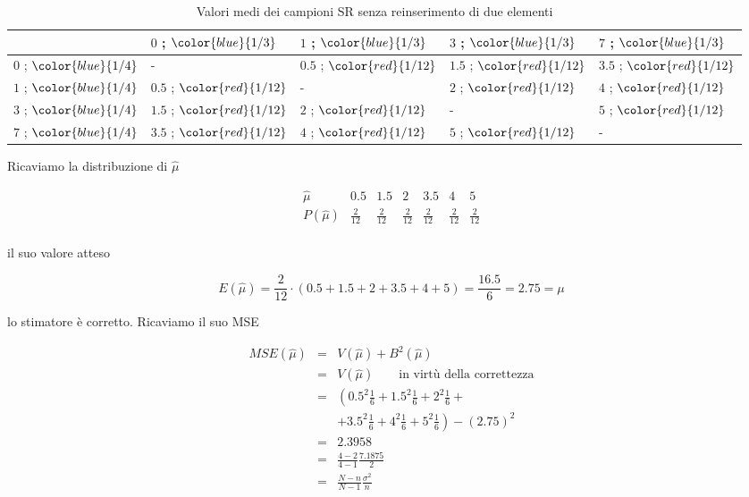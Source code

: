 \documentclass[
  11pt,
]{book}
\theoremstyle{mytheoremstyle}
\theoremstyle{mydefstyle}
\begin{document}
\begin{table}
\centering
\caption{\label{tab:csr-media}Valori medi dei campioni SR senza reinserimento di due elementi}
\centering
\begin{tabular}[t]{l|l|l|l|l}
\hline
  & $0$ ; $\color{blue}{1/3}$ & $1$ ; $\color{blue}{1/3}$ & $3$ ; $\color{blue}{1/3}$ & $7$ ; $\color{blue}{1/3}$\\
\hline
$0$ ; $\color{blue}{1/4}$ & - & $0.5$ ; $\color{red}{1/12}$ & $1.5$ ; $\color{red}{1/12}$ & $3.5$ ; $\color{red}{1/12}$\\
\hline
$1$ ; $\color{blue}{1/4}$ & $0.5$ ; $\color{red}{1/12}$ & - & $2$ ; $\color{red}{1/12}$ & $4$ ; $\color{red}{1/12}$\\
\hline
$3$ ; $\color{blue}{1/4}$ & $1.5$ ; $\color{red}{1/12}$ & $2$ ; $\color{red}{1/12}$ & - & $5$ ; $\color{red}{1/12}$\\
\hline
$7$ ; $\color{blue}{1/4}$ & $3.5$ ; $\color{red}{1/12}$ & $4$ ; $\color{red}{1/12}$ & $5$ ; $\color{red}{1/12}$ & -\\
\hline
\end{tabular}
\end{table}

Ricaviamo la distribuzione di \(\hat\mu\)

\[
\begin{array}{r|rrrrrr}
\hat\mu& 0.5 & 1.5 & 2 & 3.5 & 4 & 5 \\
\hline
P(\hat\mu) & \frac{2}{12} & \frac{2}{12} & \frac{2}{12} & \frac{2}{12} & \frac{2}{12} & \frac{2}{12} \\
\end{array}
\]

il suo valore atteso

\[
E(\hat\mu) = \frac{2}{12} \cdot (0.5 + 1.5 + 2 + 3.5 + 4 + 5) = \frac{16.5}{6} = 2.75 = \mu
\]

lo stimatore è corretto. Ricaviamo il suo MSE

\begin{eqnarray*}
MSE(\hat\mu) &=& V(\hat\mu) + B^2(\hat\mu) \\
             &=& V(\hat\mu) \qquad \text{in virtù della correttezza} \\
             &=& \left(  0.5  ^2\frac { 1 }{ 6 }+ 1.5  ^2\frac { 1 }{ 6 }+ 2  ^2\frac { 1 }{ 6 }+ \right.\\
             & & \left. + 3.5  ^2\frac { 1 }{ 6 }+ 4  ^2\frac { 1 }{ 6 }+ 5  ^2\frac { 1 }{ 6 } \right)-( 2.75 )^2\\
             &=& 2.3958\\
             &=& \frac{4-2}{4-1}\frac{7.1875}{2}\\
             &=& \frac{N-n}{N-1}\frac{\sigma^2} n
\end{eqnarray*}
\end{document}
